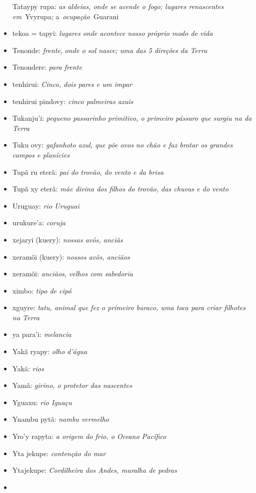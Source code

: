 \begin{itemize}
  Tataypy rupa: \emph{as aldeias, onde se acende o fogo; lugares
  renascentes em}~Yvyrupa; a~\emph{ocupação}~Guarani
\item
  tekoa = tapyi: \emph{lugares onde acontece nosso próprio modo de vida}
\item
  Tenonde: \emph{frente}, \emph{onde o sol nasce; uma das 5 direções da
  Terra}
\item
  Tenondere: \emph{para frente}
\item
  tenhirui: \emph{Cinco, dois pares e um impar}
\item
  tenhirui pindovy: \emph{cinco palmeiras azuis}
\item
  Tukanju'i: \emph{pequeno passarinho primitivo, o primeiro pássaro que
  surgiu na da Terra}
\item
  Tuku ovy: \emph{gafanhoto azul, que põe ovos no chão e faz brotar os
  grandes campos e planícies}
\item
  Tupã ru eterã: \emph{pai do trovão, do vento e da brisa}
\item
  Tupã xy eterã: \emph{mãe divina dos filhos do trovão, das chuvas e do
  vento}
\item
  Uruguay: \emph{rio Uruguai}
\item
  urukure'a: \emph{coruja}
\item
  xejaryi (kuery): \emph{nossas avós, anciãs}
\item
  xeramõi (kuery): \emph{nossos avôs, anciãos}
\item
  xeramõi: \emph{anciãos, velhos com sabedoria}
\item
  ximbo: \emph{tipo de cipó}
\item
  xguyre: \emph{tatu, animal que fez o primeiro buraco, uma toca para
  criar filhotes na Terra}
\item
  ya para'i: \emph{melancia}
\item
  Yakã ryapy: \emph{olho d'água}
\item
  Yakã: \emph{rios}
\item
  Yamã: \emph{girino, o protetor das nascentes}
\item
  Yguaxu: \emph{rio Iguaçu}
\item
  Ynambu pytã: \emph{nambu vermelho}
\item
  Yro'y rapyta: \emph{a origem do frio, o Oceano Pacífico}
\item
  Yta jekupe: \emph{contenção do mar}
\item
  Ytajekupe: \emph{Cordilheira dos Andes, muralha de pedras}
\item

\end{itemize}
